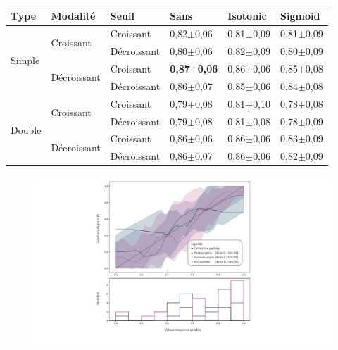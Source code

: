 \begin{table}[H]
    \begin{tabular}{llllll}
        \toprule 
        Type                    & Modalité                          & Seuil             & Sans                  & Isotonic              & Sigmoid               \\ \midrule
        \multirow{4}{*}{Simple} & \multirow{2}{*}{Croissant}        & Croissant         & 0,82$\pm$0,06         & 0,81$\pm$0,09         & 0,81$\pm$0,09         \\ \cline{3-6}
                                &                                   & Décroissant       & 0,80$\pm$0,06         & 0,82$\pm$0,09         & 0,80$\pm$0,09         \\ \cline{2-6}
                                & \multirow{2}{*}{Décroissant}      & Croissant         & \textbf{0,87$\pm$0,06}& 0,86$\pm$0,06         & 0,85$\pm$0,08         \\ \cline{3-6}
                                &                                   & Décroissant       & 0,86$\pm$0,07         & 0,85$\pm$0,06         & 0,84$\pm$0,08         \\ \cline{1-6}
        \multirow{4}{*}{Double} & \multirow{2}{*}{Croissant}        & Croissant         & 0,79$\pm$0,08         & 0,81$\pm$0,10         & 0,78$\pm$0,08         \\ \cline{3-6}
                                &                                   & Décroissant       & 0,79$\pm$0,08         & 0,81$\pm$0,08         & 0,78$\pm$0,09         \\ \cline{2-6}
                                & \multirow{2}{*}{Décroissant}      & Croissant         & 0,86$\pm$0,06         & 0,86$\pm$0,06         & 0,83$\pm$0,09         \\ \cline{3-6}
                                &                                   & Décroissant       & 0,86$\pm$0,07         & 0,86$\pm$0,06         & 0,82$\pm$0,09         \\ \bottomrule
    \end{tabular}
\end{table}

\begin{figure}[H]
    \centering
    \includegraphics[width=\linewidth]{contents/chapter_8/resources/results_calibration_sequential.pdf}
    \caption{}
    \label{fig:results_calibration_sequential}
\end{figure}\par

